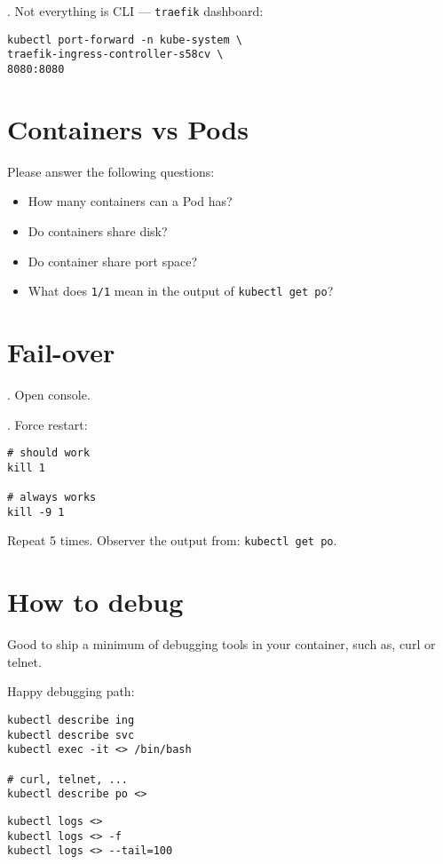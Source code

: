 \documentclass[12pt, letterpaper]{article}
\begin{document}
. Not everything is CLI --- \verb|traefik| dashboard:

\begin{verbatim}
kubectl port-forward -n kube-system \
traefik-ingress-controller-s58cv \
8080:8080
\end{verbatim}

\section{Containers vs Pods}
Please answer the following questions:
\begin{itemize}
\item How many containers can a Pod has?
\item Do containers share disk?
\item Do container share port space?
\item What does \verb|1/1| mean in the output of \verb|kubectl get po|?
\end{itemize}

\bigskip
\bigskip

\section{Fail-over}

. Open console.

. Force restart:

\begin{verbatim}
# should work
kill 1

# always works
kill -9 1
\end{verbatim}

Repeat 5 times. Observer the output from: \verb|kubectl get po|.

%
%
%
\section{How to debug}

Good to ship a minimum of debugging tools in your container, such as, curl or telnet.

Happy debugging path:

\begin{verbatim}
kubectl describe ing
kubectl describe svc
kubectl exec -it <> /bin/bash

# curl, telnet, ...
kubectl describe po <>
\end{verbatim}

\begin{verbatim}
kubectl logs <>
kubectl logs <> -f
kubectl logs <> --tail=100
\end{verbatim}
\end{document}
